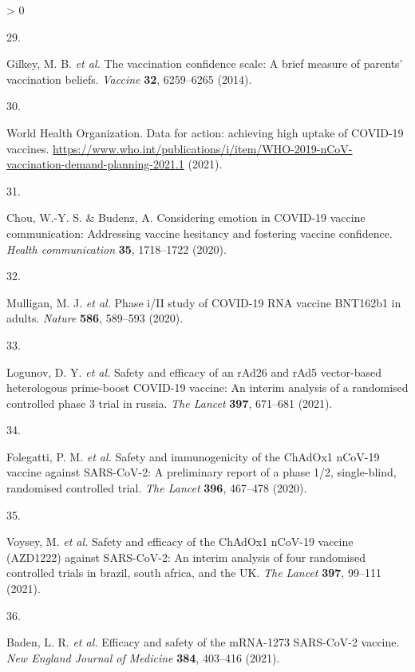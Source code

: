 \documentclass[
  12pt,
]{article}
\newlength{\cslhangindent}
\newlength{\csllabelwidth}
\newenvironment{CSLReferences}[2] %
 {%
  \setlength{\parindent}{0pt}
  \ifodd #1 \everypar{\setlength{\hangindent}{\cslhangindent}}\ignorespaces\fi
  \ifnum #2 > 0
  \setlength{\parskip}{#2\baselineskip}
  \fi
 }%
 {}
\newcommand{\CSLLeftMargin}[1]{\parbox[t]{\csllabelwidth}{#1}}
\newcommand{\CSLRightInline}[1]{\parbox[t]{\linewidth - \csllabelwidth}{#1}\break}
\begin{document}
\begin{CSLReferences}{0}{0}
\leavevmode\hypertarget{ref-gilkey2014vaccination}{}%
\CSLLeftMargin{29. }
\CSLRightInline{Gilkey, M. B. \emph{et al.} The vaccination confidence scale: A brief measure of parents' vaccination beliefs. \emph{Vaccine} \textbf{32}, 6259--6265 (2014).}

\leavevmode\hypertarget{ref-whodata}{}%
\CSLLeftMargin{30. }
\CSLRightInline{World Health Organization. {Data for action: achieving high uptake of COVID-19 vaccines}. \url{https://www.who.int/publications/i/item/WHO-2019-nCoV-vaccination-demand-planning-2021.1} (2021).}

\leavevmode\hypertarget{ref-chou2020considering}{}%
\CSLLeftMargin{31. }
\CSLRightInline{Chou, W.-Y. S. \& Budenz, A. Considering emotion in COVID-19 vaccine communication: Addressing vaccine hesitancy and fostering vaccine confidence. \emph{Health communication} \textbf{35}, 1718--1722 (2020).}

\leavevmode\hypertarget{ref-mulligan2020phase}{}%
\CSLLeftMargin{32. }
\CSLRightInline{Mulligan, M. J. \emph{et al.} Phase i/II study of COVID-19 RNA vaccine BNT162b1 in adults. \emph{Nature} \textbf{586}, 589--593 (2020).}

\leavevmode\hypertarget{ref-logunov2021safety}{}%
\CSLLeftMargin{33. }
\CSLRightInline{Logunov, D. Y. \emph{et al.} Safety and efficacy of an rAd26 and rAd5 vector-based heterologous prime-boost COVID-19 vaccine: An interim analysis of a randomised controlled phase 3 trial in russia. \emph{The Lancet} \textbf{397}, 671--681 (2021).}

\leavevmode\hypertarget{ref-folegatti2020safety}{}%
\CSLLeftMargin{34. }
\CSLRightInline{Folegatti, P. M. \emph{et al.} Safety and immunogenicity of the ChAdOx1 nCoV-19 vaccine against SARS-CoV-2: A preliminary report of a phase 1/2, single-blind, randomised controlled trial. \emph{The Lancet} \textbf{396}, 467--478 (2020).}

\leavevmode\hypertarget{ref-voysey2021safety}{}%
\CSLLeftMargin{35. }
\CSLRightInline{Voysey, M. \emph{et al.} Safety and efficacy of the ChAdOx1 nCoV-19 vaccine (AZD1222) against SARS-CoV-2: An interim analysis of four randomised controlled trials in brazil, south africa, and the UK. \emph{The Lancet} \textbf{397}, 99--111 (2021).}

\leavevmode\hypertarget{ref-baden2021efficacy}{}%
\CSLLeftMargin{36. }
\CSLRightInline{Baden, L. R. \emph{et al.} Efficacy and safety of the mRNA-1273 SARS-CoV-2 vaccine. \emph{New England Journal of Medicine} \textbf{384}, 403--416 (2021).}


\end{CSLReferences}
\end{document}
